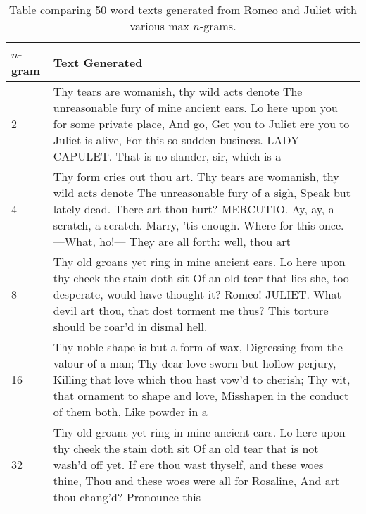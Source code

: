 \documentclass[11pt]{article}
\begin{document}
\begin{enumerate}
\begin{table}[H]
\centering
\begin{tabular}{|p{0.5in}|p{6in}|}
\hline
$n$-gram & Text Generated\\ \hline
2 & Thy tears are womanish, thy wild acts denote The unreasonable fury of mine ancient ears. Lo here upon you for some private place, And go, Get you to Juliet ere you to Juliet is alive, For this so sudden business.  LADY CAPULET. That is no slander, sir, which is a\\ \hline
4 & Thy form cries out thou art. Thy tears are womanish, thy wild acts denote The unreasonable fury of a sigh, Speak but lately dead. There art thou hurt?  MERCUTIO. Ay, ay, a scratch, a scratch. Marry, ’tis enough. Where for this once.—What, ho!— They are all forth: well, thou art\\ \hline
8 & Thy old groans yet ring in mine ancient ears. Lo here upon thy cheek the stain doth sit Of an old tear that lies she, too desperate, would have thought it? Romeo!  JULIET. What devil art thou, that dost torment me thus? This torture should be roar’d in dismal hell.\\ \hline
16 & Thy noble shape is but a form of wax, Digressing from the valour of a man; Thy dear love sworn but hollow perjury, Killing that love which thou hast vow’d to cherish; Thy wit, that ornament to shape and love, Misshapen in the conduct of them both, Like powder in a\\ \hline
32 & Thy old groans yet ring in mine ancient ears. Lo here upon thy cheek the stain doth sit Of an old tear that is not wash’d off yet. If ere thou wast thyself, and these woes thine, Thou and these woes were all for Rosaline, And art thou chang’d? Pronounce this\\ \hline
\end{tabular}
\caption{\label{table:compare} Table comparing 50 word texts generated from Romeo and Juliet with various max $n$-grams.}
\end{table}
\end{enumerate}
\end{document}
